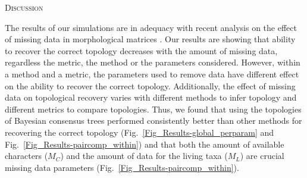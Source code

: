 \documentclass[12pt,letterpaper]{article}
\renewcommand{\section}[1]{%
\bigskip
\begin{center}
\begin{Large}
\normalfont\scshape #1
\medskip
\end{Large}
\end{center}}
\begin{document}
%
%

\section{Discussion}


The results of our simulations are in adequacy with recent analysis on the effect of missing data in morphological matrices \citep{pattinsonphylogeny2014,wrightbayesian2014,sansombias2014}. Our results are showing that ability to recover the correct topology decreases with the amount of missing data, regardless the metric, the method or the parameters considered.
However, within a method and a metric, the parameters used to remove data have different effect on the ability to recover the correct topology.
Additionally, the effect of missing data on topological recovery varies with different methods to infer topology and different metrics to compare topologies.
Thus, we found that using the topologies of Bayesian consensus trees performed consistently better than other methods for recovering the correct topology (Fig.~\ref{Fig_Results-global_perparam} and Fig.~\ref{Fig_Results-paircomp_within}) and that both the amount of available characters ($M_{C}$) and the amount of data for the living taxa ($M_{L}$) are crucial missing data parameters (Fig.~\ref{Fig_Results-paircomp_within}).
\end{document}

